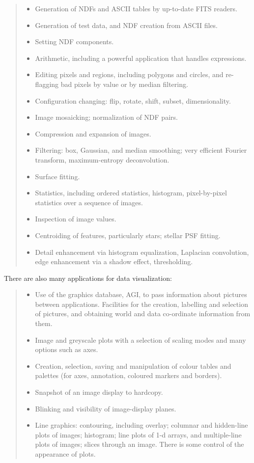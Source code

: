 {\small
\begin{quote}
\begin{itemize}
\item Generation of NDFs and ASCII tables by up-to-date FITS readers.
\item Generation of test data, and NDF creation from ASCII files.
\item Setting NDF components.
\item Arithmetic, including a powerful application that handles expressions.
\item Editing pixels and regions, including polygons and circles, and
 re-flagging bad pixels by value or by median filtering.
\item Configuration changing: flip, rotate, shift, subset, dimensionality.
\item Image mosaicking; normalization of NDF pairs.
\item Compression and expansion of images.
\item Filtering: box, Gaussian, and median smoothing; very efficient Fourier
 transform, maximum-entropy deconvolution.
\item Surface fitting.
\item Statistics, including ordered statistics, histogram, pixel-by-pixel
 statistics over a sequence of images.
\item Inspection of image values.
\item Centroiding of features, particularly stars; stellar PSF fitting.
\item Detail enhancement via histogram equalization, Laplacian convolution,
 edge enhancement via a shadow effect, thresholding.
\end{itemize}
\end{quote}
}

There are also many applications for data visualization:

{\small
\begin{quote}
\begin{itemize}
\item Use of the graphics database, AGI, to pass information about pictures
 between applications.
 Facilities for the creation, labelling and selection of pictures, and
 obtaining world and data co-ordinate information from them.
\item Image and greyscale plots with a selection of scaling modes and many
 options such as axes.
\item Creation, selection, saving and manipulation of colour tables and 
 palettes (for axes, annotation, coloured markers and borders).
\item Snapshot of an image display to hardcopy.
\item Blinking and visibility of image-display planes.
\item Line graphics: contouring, including overlay; columnar and hidden-line
 plots of images; histogram; line plots of 1-d arrays, and multiple-line plots
 of images; slices through an image.
 There is some control of the appearance of plots.
\end{itemize}
\end{quote}
}

